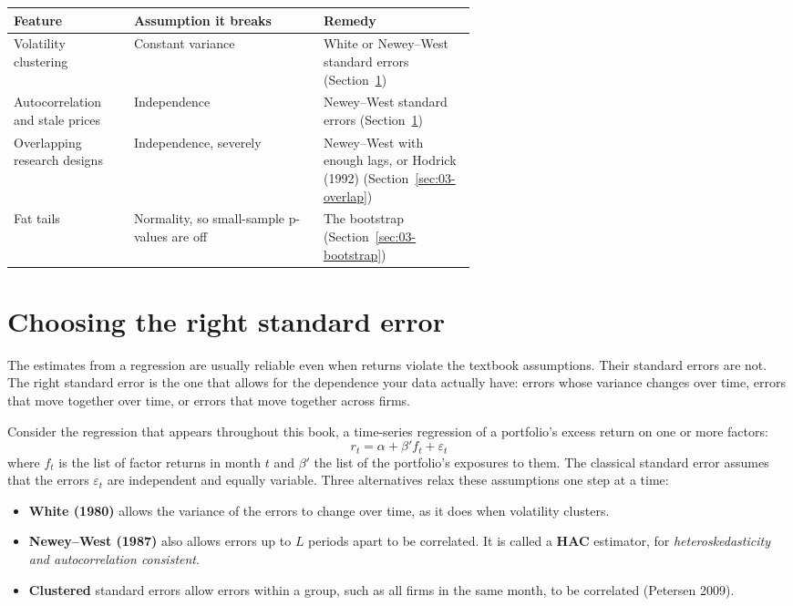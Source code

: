 \begin{center}
\small
\begin{tabularx}{0.95\linewidth}{@{}>{\raggedright\arraybackslash}p{0.26\linewidth}>{\raggedright\arraybackslash}X>{\raggedright\arraybackslash}p{0.33\linewidth}@{}}
\toprule
Feature & Assumption it breaks & Remedy \\
\midrule
Volatility clustering & Constant variance & White or Newey--West standard errors (Section~\ref{sec:03-se}) \\
Autocorrelation and stale prices & Independence & Newey--West standard errors (Section~\ref{sec:03-se}) \\
Overlapping research designs & Independence, severely & Newey--West with enough lags, or Hodrick (1992) (Section~\ref{sec:03-overlap}) \\
Fat tails & Normality, so small-sample p-values are off & The bootstrap (Section~\ref{sec:03-bootstrap}) \\
\bottomrule
\end{tabularx}
\end{center}

\section{Choosing the right standard error}
\label{sec:03-se}

The estimates from a regression are usually reliable even when returns violate
the textbook assumptions. Their standard errors are not. The right standard
error is the one that allows for the dependence your data actually have: errors
whose variance changes over time, errors that move together over time, or
errors that move together across firms.

Consider the regression that appears throughout this book, a time-series
regression of a portfolio's excess return on one or more factors:
\begin{equation}
  r_t = \alpha + \beta' f_t + \varepsilon_t
  \label{eq:03-ts}
\end{equation}
where $f_t$ is the list of factor returns in month $t$ and $\beta'$ the list of
the portfolio's exposures to them. The classical standard error assumes that
the errors $\varepsilon_t$ are independent and equally variable. Three
alternatives relax these assumptions one step at a time:

\begin{itemize}
  \item \textbf{White (1980)} allows the variance of the errors to change over
  time, as it does when volatility clusters.
  \item \textbf{Newey--West (1987)} also allows errors up to $L$ periods apart
  to be correlated. It is called a \textbf{HAC} estimator, for
  \emph{heteroskedasticity and autocorrelation consistent}.
  \item \textbf{Clustered} standard errors allow errors within a group, such as
  all firms in the same month, to be correlated (Petersen 2009).
\end{itemize}

